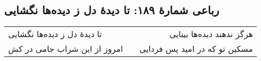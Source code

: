 \begin{center}
\section*{رباعی شمارهٔ ۱۸۹: تا دیدۀ دل ز دیده‌ها نگشایی}
\label{sec:189}
\begin{longtable}{l p{0.5cm} r}
تا دیدهٔ دل ز دیده‌ها نگشایی
&&
هرگز ندهند دیده‌ها بینایی
\\
امروز از این شراب جامی در کش
&&
مسکین تو که در امید پس فردایی
\\
\end{longtable}
\end{center}
